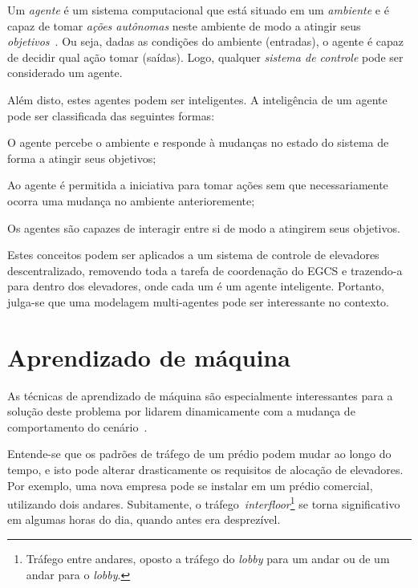 Um \textit{agente} é um sistema computacional que está situado em um \textit{ambiente} e é capaz de tomar \textit{ações autônomas} neste ambiente de modo a atingir seus \textit{objetivos}~\cite{Woolridge:2001:IMS:559667}. Ou seja, dadas as condições do ambiente (entradas), o agente é capaz de decidir qual ação tomar (saídas). Logo, qualquer \textit{sistema de controle} pode ser considerado um agente.

Além disto, estes agentes podem ser inteligentes. A inteligência de um agente pode ser classificada das seguintes formas:

\begin{description}[leftmargin=!,labelwidth=\widthof{\bfseries Pró-ativa}]
  \item[Reativa]    O agente percebe o ambiente e responde à mudanças no estado
                    do sistema de forma a atingir seus objetivos;
  \item[Pró-ativa]  Ao agente é permitida a iniciativa para tomar ações sem que
                    necessariamente ocorra uma mudança no ambiente
                    anterioremente;
  \item[Social]     Os agentes são capazes de interagir entre si de modo a
                    atingirem seus objetivos.
\end{description}

Estes conceitos podem ser aplicados a um sistema de controle de elevadores
descentralizado, removendo toda a tarefa de coordenação do EGCS e trazendo-a
para dentro dos elevadores, onde cada um é um agente inteligente. Portanto,
julga-se que uma modelagem multi-agentes pode ser interessante no contexto.

\section{\label{section:machinelearning}Aprendizado de máquina}

As técnicas de aprendizado de máquina são especialmente interessantes para a
solução deste problema por lidarem dinamicamente com a mudança de comportamento
do cenário~\cite{Russell:2003:AIM:773294}.

Entende-se que os padrões de tráfego de um prédio podem mudar ao longo do tempo,
e isto pode alterar drasticamente os requisitos de alocação de elevadores. Por
exemplo, uma nova empresa pode se instalar em um prédio comercial, utilizando
dois andares. Subitamente, o tráfego~\textit{interfloor}\footnote{Tráfego entre
andares, oposto a tráfego do \textit{lobby} para um andar ou de um andar para
o \textit{lobby}.} se torna significativo em algumas horas do dia, quando antes
era desprezível.

